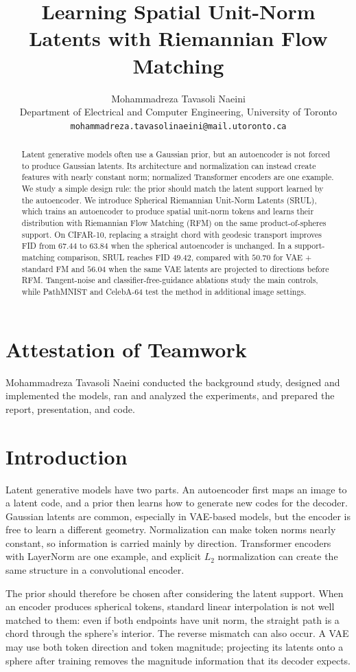 \documentclass{article}
\title{Learning Spatial Unit-Norm Latents with Riemannian Flow Matching}
\author{Mohammadreza Tavasoli Naeini \\
Department of Electrical and Computer Engineering, University of Toronto \\
\texttt{mohammadreza.tavasolinaeini@mail.utoronto.ca}}
\begin{document}
\maketitle

\begin{abstract}
Latent generative models often use a Gaussian prior, but an autoencoder is not forced to produce Gaussian latents. Its architecture and normalization can instead create features with nearly constant norm; normalized Transformer encoders are one example. We study a simple design rule: the prior should match the latent support learned by the autoencoder. We introduce Spherical Riemannian Unit-Norm Latents (SRUL), which trains an autoencoder to produce spatial unit-norm tokens and learns their distribution with Riemannian Flow Matching (RFM) on the same product-of-spheres support. On CIFAR-10, replacing a straight chord with geodesic transport improves FID from $67.44$ to $63.84$ when the spherical autoencoder is unchanged. In a support-matching comparison, SRUL reaches FID $49.42$, compared with $50.70$ for VAE + standard FM and $56.04$ when the same VAE latents are projected to directions before RFM. Tangent-noise and classifier-free-guidance ablations study the main controls, while PathMNIST and CelebA-64 test the method in additional image settings.
\end{abstract}

\section*{Attestation of Teamwork}
Mohammadreza Tavasoli Naeini conducted the background study, designed and implemented the models, ran and analyzed the experiments, and prepared the report, presentation, and code.

\section{Introduction}
Latent generative models have two parts. An autoencoder first maps an image to a latent code, and a prior then learns how to generate new codes for the decoder. Gaussian latents are common, especially in VAE-based models, but the encoder is free to learn a different geometry. Normalization can make token norms nearly constant, so information is carried mainly by direction. Transformer encoders with LayerNorm are one example, and explicit $L_2$ normalization can create the same structure in a convolutional encoder.

The prior should therefore be chosen after considering the latent support. When an encoder produces spherical tokens, standard linear interpolation is not well matched to them: even if both endpoints have unit norm, the straight path is a chord through the sphere's interior. The reverse mismatch can also occur. A VAE may use both token direction and token magnitude; projecting its latents onto a sphere after training removes the magnitude information that its decoder expects.
\end{document}
